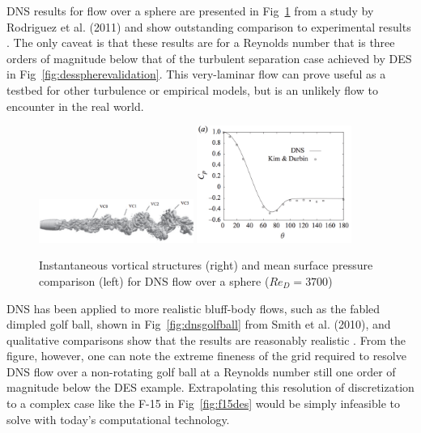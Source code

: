 \documentclass[journal]{new-aiaa}
\begin{document}
DNS results for flow over a sphere are presented in Fig~\ref{fig:dnssphere} from a study by Rodriguez et al. (2011) and show outstanding comparison to experimental results \cite{rodriguez2011direct}. The only caveat is that these results are for a Reynolds number that is three orders of magnitude below that of the turbulent separation case achieved by DES in Fig~\ref{fig:desspherevalidation}. This very-laminar flow can prove useful as a testbed for other turbulence or empirical models, but is an unlikely flow to encounter in the real world.

\begin{figure}[H]
\begin{center}
\includegraphics[width=0.45\textwidth]{Images/logan/rodriguez2011direct_DNSsphereWake.pdf}
\includegraphics[width=0.45\textwidth]{Images/logan/rodriguez2011direct_DNSsphereCp.pdf}
\caption{ Instantaneous vortical structures (right) and mean surface pressure comparison (left) for DNS flow over a sphere ($Re_D = 3700$) \cite{rodriguez2011direct} }
\label{fig:dnssphere}
\end{center}
\end{figure}


DNS has been applied to more realistic bluff-body flows, such as the fabled dimpled golf ball, shown in Fig~\ref{fig:dnsgolfball} from Smith et al. (2010), and qualitative comparisons show that the results are reasonably realistic \cite{smith2010numerical}. From the figure, however, one can note the extreme fineness of the grid required to resolve DNS flow over a non-rotating golf ball at a Reynolds number still one order of magnitude below the DES example. Extrapolating this resolution of discretization to a complex case like the F-15 in Fig~\ref{fig:f15des} would be simply infeasible to solve with today's computational technology.
\end{document}
